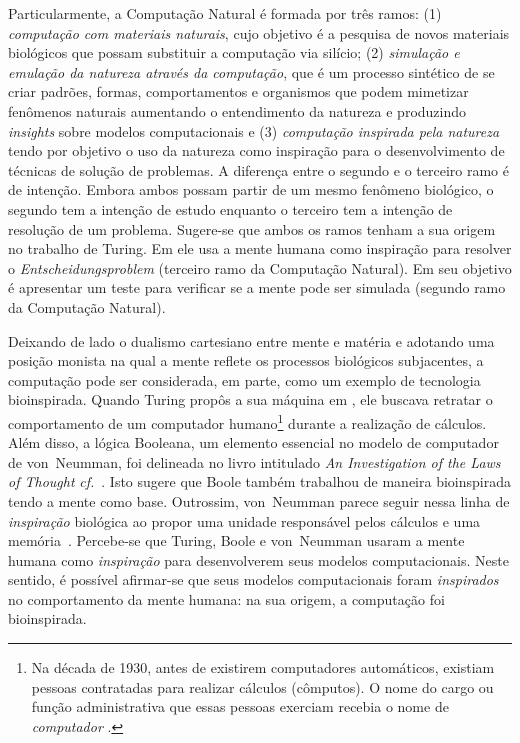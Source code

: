 Particularmente, a Computação Natural é formada por três ramos: (1) \textit{computação com materiais naturais}, cujo objetivo é a pesquisa de novos materiais biológicos que possam substituir a computação via silício; (2) \textit{simulação e emulação da natureza através da computação}, que é um processo sintético de se criar padrões, formas, comportamentos e organismos que podem mimetizar fenômenos naturais aumentando o entendimento da natureza e produzindo \textit{insights} sobre modelos computacionais e (3) \textit{computação inspirada pela natureza} tendo por objetivo o uso da natureza como inspiração para o desenvolvimento de técnicas de solução de problemas\cite{decastro06}. A diferença entre o segundo e o terceiro ramo é de intenção. Embora ambos possam partir de um mesmo fenômeno biológico, o segundo tem a intenção de estudo enquanto o terceiro tem a intenção de resolução de um problema. Sugere-se que ambos os ramos tenham a sua origem no trabalho de Turing. Em \cite{turing36} ele usa a mente humana como inspiração para resolver o \textit{Entscheidungsproblem} (terceiro ramo da Computação Natural). Em \cite{turing52} seu objetivo é apresentar um teste para verificar se a mente pode ser simulada (segundo ramo da Computação Natural).


Deixando de lado o dualismo cartesiano entre mente e matéria e adotando uma posição monista na qual a mente reflete os processos biológicos subjacentes, a computação pode ser considerada, em parte, como um exemplo de tecnologia bioinspirada. Quando Turing propôs a sua máquina em \cite{turing36}, ele buscava retratar o comportamento de um computador humano\footnote{Na década de 1930, antes de existirem computadores automáticos, existiam pessoas contratadas para realizar cálculos (cômputos). O nome do cargo ou função administrativa que essas pessoas exerciam recebia o nome de \emph{computador} \cite{}.} durante a realização de cálculos. Além disso, a lógica Booleana, um elemento essencial no modelo de computador de von~Neumman, foi delineada no livro intitulado \textit{An Investigation of the Laws of Thought} \textit{cf.}~\cite{boole}. Isto sugere que Boole também trabalhou de maneira bioinspirada tendo a mente como base. Outrossim, von~Neumman parece seguir nessa linha de \emph{inspiração} biológica ao propor uma unidade responsável pelos cálculos e uma memória~\cite{Newmann:1945:FDR:1102046}. Percebe-se que Turing, Boole e von~Neumman usaram a mente humana como \emph{inspiração} para desenvolverem seus modelos computacionais. Neste sentido, é possível afirmar-se que seus modelos computacionais foram \emph{inspirados} no comportamento da mente humana: na sua origem, a computação foi bioinspirada.

